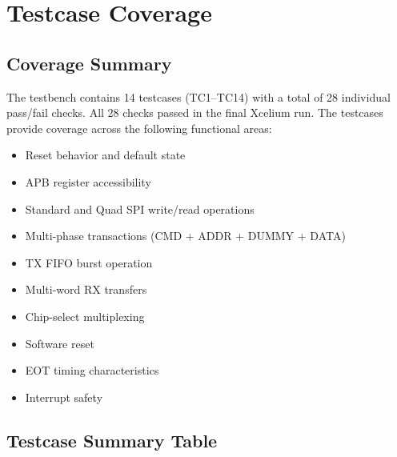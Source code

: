 \chapter{Testcase Coverage}
\label{ch:tc_coverage}

\section{Coverage Summary}

The testbench contains 14 testcases (TC1--TC14) with a total of 28 individual pass/fail checks.
All 28 checks passed in the final Xcelium run. The testcases provide coverage across the following
functional areas:

\begin{itemize}[leftmargin=2em]
  \item Reset behavior and default state
  \item APB register accessibility
  \item Standard and Quad SPI write/read operations
  \item Multi-phase transactions (CMD + ADDR + DUMMY + DATA)
  \item TX FIFO burst operation
  \item Multi-word RX transfers
  \item Chip-select multiplexing
  \item Software reset
  \item EOT timing characteristics
  \item Interrupt safety
\end{itemize}

\section{Testcase Summary Table}

